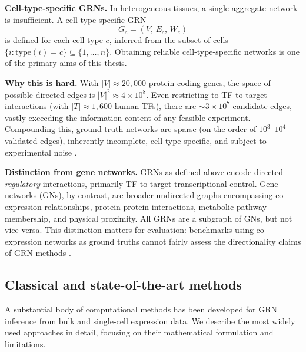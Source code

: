 \textbf{Cell-type-specific GRNs.} In heterogeneous tissues, a single aggregate network is
insufficient. A cell-type-specific \gls{GRN}
\begin{equation}
  G_c = (V,\, E_c,\, W_c)
\end{equation}
is defined for each cell type \(c\), inferred from the subset of cells \(\{i : \text{type}(i) = c\}
\subseteq \{1,\ldots,n\}\). Obtaining reliable cell-type-specific networks is one of the primary
aims of this thesis.

\textbf{Why this is hard.} With \(|V| \approx 20{,}000\) protein-coding genes, the space of
possible directed edges is \(|V|^2 \approx 4 \times 10^8\). Even restricting to
\gls{TF}-to-target interactions (with \(|T| \approx 1{,}600\) human \glspl{TF}), there are
\(\sim\! 3 \times 10^7\) candidate edges, vastly exceeding the information content of any
feasible experiment. Compounding this, ground-truth networks are sparse (on the order of
\(10^3\)--\(10^4\) validated edges), inherently incomplete, cell-type-specific, and subject to
experimental noise \cite{mercatelliGeneRegulatoryNetwork2020}.

\textbf{Distinction from gene networks.} \glspl{GRN} as defined above encode directed
\emph{regulatory} interactions, primarily \gls{TF}-to-target transcriptional control.
Gene networks (\glspl{GN}), by contrast, are broader undirected graphs encompassing
co-expression relationships, protein-protein interactions, metabolic pathway membership, and
physical proximity. All \glspl{GRN} are a subgraph of \glspl{GN}, but not vice versa. This
distinction matters for evaluation: benchmarks using co-expression networks as ground truths
cannot fairly assess the directionality claims of \gls{GRN} methods
\cite{badia-i-mompelGeneRegulatoryNetwork2023}.

\subsection{Classical and state-of-the-art methods}

A substantial body of computational methods has been developed for \gls{GRN} inference from bulk
and single-cell expression data. We describe the most widely used approaches in detail, focusing
on their mathematical formulation and limitations.

